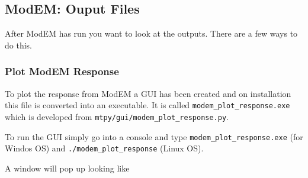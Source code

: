 \subsection{ModEM: Ouput Files}
\label{sec:modeling.modem.output}

After ModEM has run you want to look at the outputs.  There are a few ways to do this.  

\subsubsection{Plot ModEM Response}
\label{sec:modeling.modem.plot_response}

To plot the response from ModEM a GUI has been created and on installation this file is converted into an executable.  It is called \verb|modem_plot_response.exe| which is developed from \verb|mtpy/gui/modem_plot_response.py|.

To run the GUI simply go into a console and type \verb|modem_plot_response.exe| (for Windos OS) and \verb|./modem_plot_response| (Linux OS).

A window will pop up looking like

